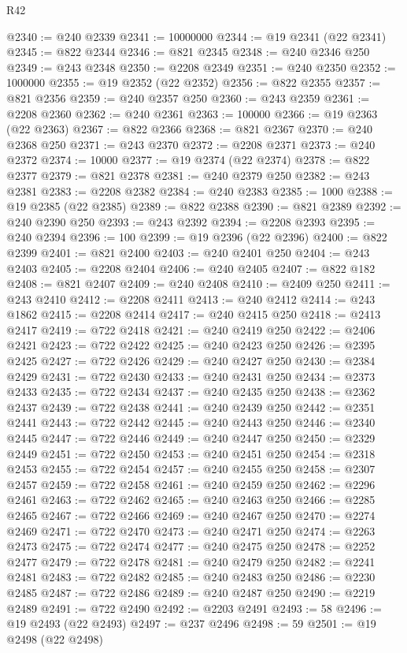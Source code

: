 \begin{lexlean}{R42}
\begin{coremodule}
{@2340 := @240 @2339
@2341 := 10000000
@2344 := @19 @2341 (@22 @2341)
@2345 := @822 @2344
@2346 := @821 @2345
@2348 := @240 @2346 @250
@2349 := @243 @2348
@2350 := @2208 @2349
@2351 := @240 @2350
@2352 := 1000000
@2355 := @19 @2352 (@22 @2352)
@2356 := @822 @2355
@2357 := @821 @2356
@2359 := @240 @2357 @250
@2360 := @243 @2359
@2361 := @2208 @2360
@2362 := @240 @2361
@2363 := 100000
@2366 := @19 @2363 (@22 @2363)
@2367 := @822 @2366
@2368 := @821 @2367
@2370 := @240 @2368 @250
@2371 := @243 @2370
@2372 := @2208 @2371
@2373 := @240 @2372
@2374 := 10000
@2377 := @19 @2374 (@22 @2374)
@2378 := @822 @2377
@2379 := @821 @2378
@2381 := @240 @2379 @250
@2382 := @243 @2381
@2383 := @2208 @2382
@2384 := @240 @2383
@2385 := 1000
@2388 := @19 @2385 (@22 @2385)
@2389 := @822 @2388
@2390 := @821 @2389
@2392 := @240 @2390 @250
@2393 := @243 @2392
@2394 := @2208 @2393
@2395 := @240 @2394
@2396 := 100
@2399 := @19 @2396 (@22 @2396)
@2400 := @822 @2399
@2401 := @821 @2400
@2403 := @240 @2401 @250
@2404 := @243 @2403
@2405 := @2208 @2404
@2406 := @240 @2405
@2407 := @822 @182
@2408 := @821 @2407
@2409 := @240 @2408
@2410 := @2409 @250
@2411 := @243 @2410
@2412 := @2208 @2411
@2413 := @240 @2412
@2414 := @243 @1862
@2415 := @2208 @2414
@2417 := @240 @2415 @250
@2418 := @2413 @2417
@2419 := @722 @2418
@2421 := @240 @2419 @250
@2422 := @2406 @2421
@2423 := @722 @2422
@2425 := @240 @2423 @250
@2426 := @2395 @2425
@2427 := @722 @2426
@2429 := @240 @2427 @250
@2430 := @2384 @2429
@2431 := @722 @2430
@2433 := @240 @2431 @250
@2434 := @2373 @2433
@2435 := @722 @2434
@2437 := @240 @2435 @250
@2438 := @2362 @2437
@2439 := @722 @2438
@2441 := @240 @2439 @250
@2442 := @2351 @2441
@2443 := @722 @2442
@2445 := @240 @2443 @250
@2446 := @2340 @2445
@2447 := @722 @2446
@2449 := @240 @2447 @250
@2450 := @2329 @2449
@2451 := @722 @2450
@2453 := @240 @2451 @250
@2454 := @2318 @2453
@2455 := @722 @2454
@2457 := @240 @2455 @250
@2458 := @2307 @2457
@2459 := @722 @2458
@2461 := @240 @2459 @250
@2462 := @2296 @2461
@2463 := @722 @2462
@2465 := @240 @2463 @250
@2466 := @2285 @2465
@2467 := @722 @2466
@2469 := @240 @2467 @250
@2470 := @2274 @2469
@2471 := @722 @2470
@2473 := @240 @2471 @250
@2474 := @2263 @2473
@2475 := @722 @2474
@2477 := @240 @2475 @250
@2478 := @2252 @2477
@2479 := @722 @2478
@2481 := @240 @2479 @250
@2482 := @2241 @2481
@2483 := @722 @2482
@2485 := @240 @2483 @250
@2486 := @2230 @2485
@2487 := @722 @2486
@2489 := @240 @2487 @250
@2490 := @2219 @2489
@2491 := @722 @2490
@2492 := @2203 @2491
@2493 := 58
@2496 := @19 @2493 (@22 @2493)
@2497 := @237 @2496
@2498 := 59
@2501 := @19 @2498 (@22 @2498)
}
\end{coremodule}
\end{lexlean}
